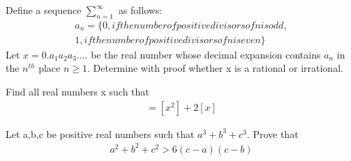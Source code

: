 \item Define a sequence $\sum_{n=1}^{\infty}$ as follows:
\begin{align*}
a_n = \{0, if the number of positive divisors of n is odd,\\ 1,if the number of positive divisors of n is even \}
\end{align*}
Let $x=0.a_1a_2a_3$.... be the real number whose decimal expansion contains $a_n$ in the $n^{th}$ place $n \geq 1$. Determine with proof whether x is a rational or irrational.

\item Find all real numbers x such that 
\begin{align*}
[x^{2} + 2x] = [x^{2}] + 2[x]
\end{align*}

\item Let a,b,c be positive real numbers such that $a^{3} + b^{3} + c^{3}$. Prove that
\begin{align*}
a^{2} + b^{2} + c^{2} > 6(c - a)(c - b)
\end{align*}

















